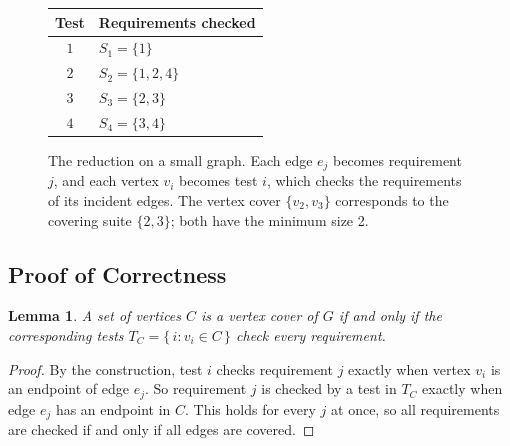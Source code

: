\documentclass[conference]{IEEEtran}
\newtheorem{lemma}{Lemma}
\theoremstyle{definition}
\theoremstyle{remark}
\begin{document}
\begin{figure}[t]
\centering
\begin{minipage}{0.42\columnwidth}
\centering
{}
\end{minipage}%
\hfill
\begin{minipage}{0.55\columnwidth}
\centering\small
\begin{tabular}{@{}cl@{}}
\toprule
Test & Requirements checked \\
\midrule
$1$ & $S_1 = \{1\}$ \\
$2$ & $S_2 = \{1, 2, 4\}$ \\
$3$ & $S_3 = \{2, 3\}$ \\
$4$ & $S_4 = \{3, 4\}$ \\
\bottomrule
\end{tabular}
\end{minipage}
\caption{The reduction on a small graph. Each edge $e_j$ becomes requirement
$j$, and each vertex $v_i$ becomes test $i$, which checks the requirements of
its incident edges. The vertex cover $\{v_2, v_3\}$ corresponds to the covering
suite $\{2, 3\}$; both have the minimum size 2.}
\label{fig:reduction}
\end{figure}

\subsection{Proof of Correctness}
\begin{lemma}\label{lem:subset}
A set of vertices $C$ is a vertex cover of $G$ if and only if the
corresponding tests $T_C = \{\, i : v_i \in C \,\}$ check every requirement.
\end{lemma}
\begin{proof}
By the construction, test $i$ checks requirement $j$ exactly when vertex
$v_i$ is an endpoint of edge $e_j$. So requirement $j$ is checked by a test
in $T_C$ exactly when edge $e_j$ has an endpoint in $C$. This holds for every
$j$ at once, so all requirements are checked if and only if all edges are
covered.
\end{proof}
\end{document}
